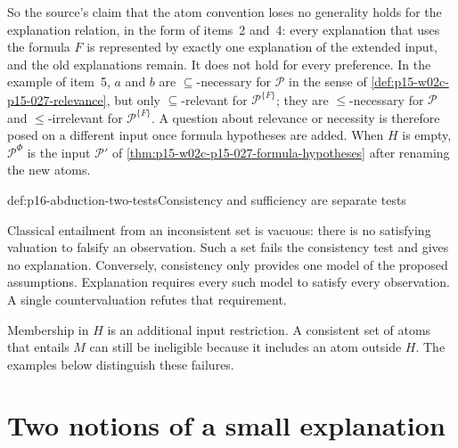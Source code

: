 So the source's claim that the atom convention loses no generality holds
for the explanation relation, in the form of items~2 and~4: every
explanation that uses the formula \(F\) is represented by exactly one
explanation of the extended input, and the old explanations remain. It
does not hold for every preference. In the example of item~5, \(a\) and
\(b\) are \(\subseteq\)-necessary for \(\mathcal P\) in the sense of
\cref{def:p15-w02c-p15-027-relevance}, but only \(\subseteq\)-relevant
for \(\mathcal P^{\{F\}}\); they are \(\le\)-necessary for
\(\mathcal P\) and \(\le\)-irrelevant for \(\mathcal P^{\{F\}}\). A question about relevance or necessity is therefore posed on
a different input once formula hypotheses are added. When \(H\) is
empty, \(\mathcal P^{\Phi}\) is the input \(\mathcal P'\) of
\cref{thm:p15-w02c-p15-027-formula-hypotheses} after renaming the new
atoms.

\begin{hbwarning}{def:p16-abduction-two-tests}{Consistency and sufficiency are separate tests}
\par\nobreak
Classical entailment from an inconsistent set is vacuous: there is no
satisfying valuation to falsify an observation. Such a set fails the
consistency test and gives no explanation. Conversely, consistency only
provides one model of the proposed assumptions. Explanation requires every
such model to satisfy every observation. A single countervaluation refutes
that requirement.

Membership in \(H\) is an additional input restriction. A consistent set
of atoms that entails \(M\) can still be ineligible because it includes
an atom outside \(H\). The examples below distinguish these failures.
\end{hbwarning}

\section{Two notions of a small explanation}
\label{sec:p16-abduction-minimality}


